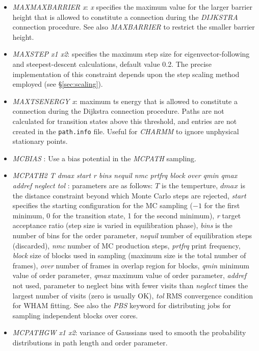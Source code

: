 \documentclass[12pt,a4paper,dvips]{article}
\begin{document}
\begin{itemize}
\item {\it MAXMAXBARRIER x\/}: {\it x\/} specifies the maximum value for the larger barrier height that 
is allowed to constitute a connection during the
{\it DIJKSTRA \/}connection procedure. 
See also {\it MAXBARRIER\/} to restrict the smaller barrier height.

\item {\it MAXSTEP x1 x2\/}: specifies the maximum step size for eigenvector-following and
steepest-descent calculations, default value 0.2. The precise
implementation of this constraint depends upon the step scaling method employed (see \S\ref{sec:scaling}).

\item {\it MAXTSENERGY x\/}: maximum ts energy that is allowed to constitute a connection during the
Dijkstra connection procedure. Paths are not calculated for transition states above
this threshold, and entries are not created in the {\tt path.info} file.
Useful for {\it CHARMM\/} to ignore unphysical stationary points.

\item {\it MCBIAS \/}: Use a bias potential in the {\it MCPATH\/} sampling. 

\item {\it MCPATH2 T dmax start r bins nequil nmc prtfrq block over qmin qmax addref neglect tol \/}: parameters are as follows: $T$ is the temperture, $dmax$ is the distance
constraint beyond which Monte Carlo steps are rejected, {\it start} specifies the starting configuration for the
MC sampling ($-1$ for the first minimum, 0 for the transition state, 1 for the second minimum),
{\it r} target acceptance ratio (step size is varied in equilibration phase),
{\it bins} is the number of bins for the order parameter,
{\it nequil} number of equilibration steps (discarded),
{\it nmc} number of MC production steps,
{\it prtfrq} print frequency,
{\it block} size of blocks used in sampling (maximum size is the total number of frames),
{\it over} number of frames in overlap region for blocks,
{\it qmin} minimum value of order parameter,
{\it qmax} maximum value of order parameter,
{\it addref} not used,
parameter to neglect bins with fewer visits than {\it neglect} times the largest number of visits (zero is usually OK),
{\it tol} RMS convergence condition for WHAM fitting.
See also the {\it PBS} keyword for distributing jobs for sampling independent blocks over cores.

\item {\it MCPATHGW x1 x2\/}:  variance of Gaussians used to smooth the probability distributions in 
path length and order parameter.


\end{itemize}
\end{document}
